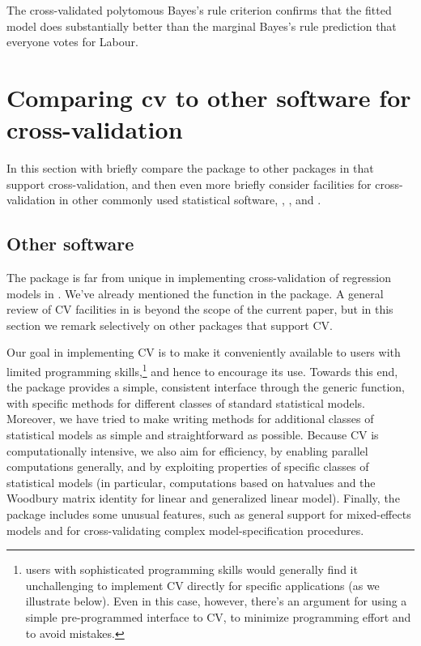 \documentclass[
]{jss}
\begin{document}
The cross-validated polytomous Bayes's rule criterion confirms that the
fitted model does substantially better than the marginal Bayes's rule
prediction that everyone votes for Labour.

\section{Comparing cv to other software for
cross-validation}\label{comparing-cv-to-other-software-for-cross-validation}

In this section with briefly compare the  package to other
packages in  that support cross-validation, and then even
more briefly consider facilities for cross-validation in other commonly
used statistical software, , , and
.

\subsection[Other R software]{Other  software}\label{other-r-software}

The  package is far from unique in implementing cross-validation
of regression models in . We've already mentioned the
 function in the  package. A general review of
CV facilities in  is beyond the scope of the current paper,
but in this section we remark selectively on other  packages
that support CV.

Our goal in implementing CV is to make it conveniently available to
 users with limited programming skills,\footnote{
  users with sophisticated programming skills would generally find it
  unchallenging to implement CV directly for specific applications (as
  we illustrate below). Even in this case, however, there's an argument
  for using a simple pre-programmed interface to CV, to minimize
  programming effort and to avoid mistakes.} and hence to encourage its
use. Towards this end, the  package provides a simple,
consistent interface through the  generic function, with
specific methods for different classes of standard 
statistical models. Moreover, we have tried to make writing methods for
additional classes of statistical models as simple and straightforward
as possible. Because CV is computationally intensive, we also aim for
efficiency, by enabling parallel computations generally, and by
exploiting properties of specific classes of statistical models (in
particular, computations based on hatvalues and the Woodbury matrix
identity for linear and generalized linear model). Finally, the package
includes some unusual features, such as general support for
mixed-effects models and for cross-validating complex
model-specification procedures.
\end{document}
